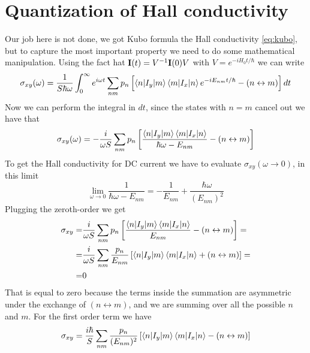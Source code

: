 \section{Quantization of Hall conductivity}
Our job here is not done, we got Kubo formula the Hall conductivity \ref{eq:kubo}, but to capture the most important property we need to do some mathematical manipulation. Using the fact hat $\mathbf{I}(t)=V^{-1}\mathbf{I}(0) V$ with $V=e^{-iH_0t/\hbar}$ we can write
\[
    \sigma_{xy}(\omega)=\frac 1{S\hbar \omega}\int_0^{\infty}e^{i\omega t}\sum_{nm}p_n
    \left[
        \braket{n|I_y}{m}\braket{m|I_x}{n}e^{-iE_{nm}t/\hbar}-(n\leftrightarrow m) %
    \right]
    dt
\]
Now we can perform the integral in $dt$, since the states with $n=m$ cancel out we have that
\begin{equation}
    \sigma_{xy}(\omega)=-\frac i{\omega S} \sum_{nm}p_n\left[
        \frac{\braket{n|I_y}{m}\braket{m|I_x}{n}}{\hbar \omega - E_{nm}} - (n\leftrightarrow m)
    \right]
\end{equation}
To get the Hall conductivity for DC current we have to evaluate $\sigma_{xy}(\omega\to 0)$, in this limit
\[
    \lim_{\omega\to 0}\frac{1}{\hbar \omega-E_{nm}}=-\frac 1{E_{nm}}+\frac{\hbar \omega}{(E_{nm})^2}    
\]
Plugging the zeroth-order we get
\begin{equation}
    \begin{split}
    \sigma_{xy}=&\frac i{\omega S} \sum_{nm}p_n\left[
        \frac{\braket{n|I_y}{m}\braket{m|I_x}{n}}{E_{nm}} - (n\leftrightarrow m)
    \right]= \\
    =&\frac i{\omega S}\sum_{nm}\frac{p_n}{E_{nm}}\left[
        \braket{n|I_y}{m}\braket{m|I_x}{n} + (n\leftrightarrow m)
    \right]=\\
    =&0
    \end{split}
\end{equation}
That is equal to zero because the terms inside the summation are asymmetric under the exchange of $(n\leftrightarrow m)$, and we are summing over all the possible $n$ and $m$. For the first order term we have
\begin{equation}
    \sigma_{xy}=\frac{i\hbar}S\sum_{nm}\frac{p_n}{(E_{nm})^2}\left[
        \braket{n|I_y}{m}\braket{m|I_x}{n} - (n\leftrightarrow m)
    \right]
\end{equation}


